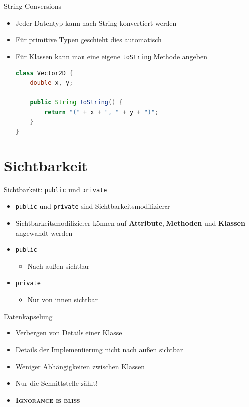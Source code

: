 \documentclass[18pt]{beamer}
\begin{document}
\begin{frame}[fragile]{String Conversions}
    \begin{itemize}
        \item Jeder Datentyp kann nach String konvertiert werden
        \item Für primitive Typen geschieht dies automatisch
        \item Für Klassen kann man eine eigene \texttt{toString} Methode angeben
        \begin{lstlisting}[language=Java]
class Vector2D {
    double x, y;

    public String toString() {
        return "(" + x + ", " + y + ")";
    }
}
        \end{lstlisting}
    \end{itemize}
\end{frame}

\section{Sichtbarkeit}

\begin{frame}{Sichtbarkeit: \texttt{public} und \texttt{private}}

    \begin{itemize}
        \item \texttt{public} und \texttt{private} sind Sichtbarkeitsmodifizierer
        \item Sichtbarkeitsmodifizierer können auf \textbf{Attribute}, \textbf{Methoden} und \textbf{Klassen} angewandt werden
        \item \texttt{public}
        \begin{itemize}
            \item Nach außen sichtbar
        \end{itemize}
        \item \texttt{private}
        \begin{itemize}
            \item Nur von innen sichtbar
        \end{itemize}
    \end{itemize}
\end{frame}

\begin{frame}{Datenkapselung}
    \begin{itemize}
        \item Verbergen von Details einer Klasse
        \item Details der Implementierung nicht nach außen sichtbar
        \item Weniger Abhängigkeiten zwischen Klassen
        \item Nur die Schnittstelle zählt!
        \item \textbf{\textsc{Ignorance is bliss}}
    \end{itemize}
\end{frame}
\end{document}
